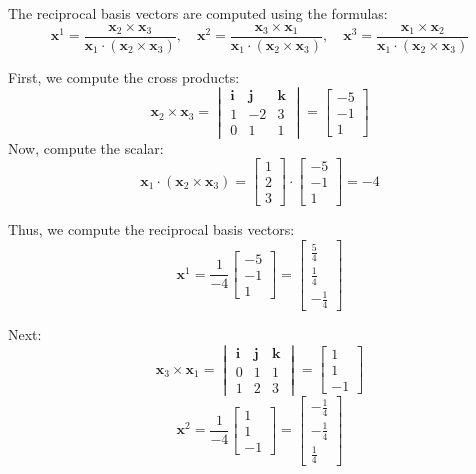 \documentclass{article}
\begin{document}
The reciprocal basis vectors are computed using the formulas:
\[
\mathbf{x}^1 = \frac{\mathbf{x}_2 \times \mathbf{x}_3}{\mathbf{x}_1 \cdot (\mathbf{x}_2 \times \mathbf{x}_3)}, \quad
\mathbf{x}^2 = \frac{\mathbf{x}_3 \times \mathbf{x}_1}{\mathbf{x}_1 \cdot (\mathbf{x}_2 \times \mathbf{x}_3)}, \quad
\mathbf{x}^3 = \frac{\mathbf{x}_1 \times \mathbf{x}_2}{\mathbf{x}_1 \cdot (\mathbf{x}_2 \times \mathbf{x}_3)}
\]

First, we compute the cross products:
\[
\mathbf{x}_2 \times \mathbf{x}_3 = \begin{vmatrix}
\mathbf{i} & \mathbf{j} & \mathbf{k} \\
1 & -2 & 3 \\
0 & 1 & 1
\end{vmatrix}
= \begin{bmatrix} -5 \\ -1 \\ 1 \end{bmatrix}
\]
Now, compute the scalar:
\[
\mathbf{x}_1 \cdot (\mathbf{x}_2 \times \mathbf{x}_3) = \begin{bmatrix} 1 \\ 2 \\ 3 \end{bmatrix} \cdot \begin{bmatrix} -5 \\ -1 \\ 1 \end{bmatrix} = -4
\]

Thus, we compute the reciprocal basis vectors:
\[
\mathbf{x}^1 = \frac{1}{-4} \begin{bmatrix} -5 \\ -1 \\ 1 \end{bmatrix} = \begin{bmatrix} \frac{5}{4} \\ \frac{1}{4} \\ -\frac{1}{4} \end{bmatrix}
\]

Next:
\[
\mathbf{x}_3 \times \mathbf{x}_1 = \begin{vmatrix}
\mathbf{i} & \mathbf{j} & \mathbf{k} \\
0 & 1 & 1 \\
1 & 2 & 3
\end{vmatrix}
= \begin{bmatrix} 1 \\ 1 \\ -1 \end{bmatrix}
\]
\[
\mathbf{x}^2 = \frac{1}{-4} \begin{bmatrix} 1 \\ 1 \\ -1 \end{bmatrix} = \begin{bmatrix} -\frac{1}{4} \\ -\frac{1}{4} \\ \frac{1}{4} \end{bmatrix}
\]
\end{document}
